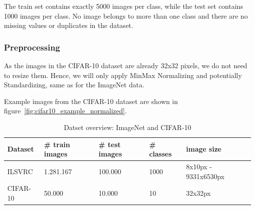 The train set contains exactly 5000 images per class, while the test set contains 1000 images per class.
No image belongs to more than one class and there are no missing values or duplicates in the dataset.

\subsubsection{Preprocessing}
As the images in the CIFAR-10 dataset are already 32x32 pixels, we do not need to resize them.
Hence, we will only apply MinMax Normalizing and potentially Standardizing, same as for the ImageNet data.

Example images from the CIFAR-10 dataset are shown in figure~\ref{fig:cifar10_example_normalized}.

\begin{table}[h]
    \begin{tabular}{lllll}
        Dataset  & \# train images & \# test images & \# classes & image size           \\ \hline \hline
        ILSVRC   & 1.281.167       & 100.000        & 1000       & 8x10px - 9331x6530px \\
        CIFAR-10 & 50.000          & 10.000         & 10         & 32x32px              \\ \hline \hline
    \end{tabular}
    \caption{Datset overview: ImageNet and CIFAR-10}
    \label{tab:datasets}
\end{table}
